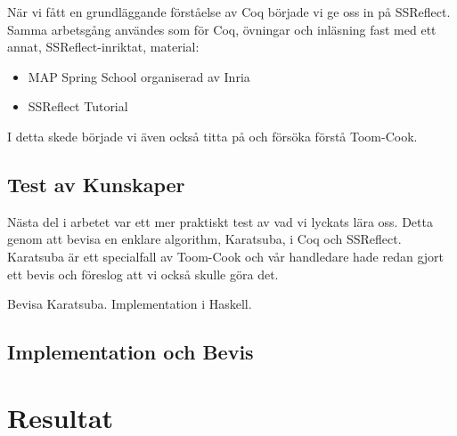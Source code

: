 \documentclass[a4paper]{article}
\begin{document}
När vi fått en grundläggande förståelse av Coq började vi ge oss in på
SSReflect. Samma arbetsgång användes som för Coq, övningar och inläsning fast
med ett annat, SSReflect-inriktat, material:
\begin{itemize}
  \item MAP Spring School organiserad av Inria
  \item SSReflect Tutorial
\end{itemize}
I detta skede började vi även också titta på och försöka förstå Toom-Cook.

\subsection{Test av Kunskaper}
Nästa del i arbetet var ett mer praktiskt test av vad vi lyckats lära oss.
Detta genom att bevisa en enklare algorithm, Karatsuba, i Coq och SSReflect.
Karatsuba är ett specialfall av Toom-Cook och vår handledare hade redan gjort
ett bevis och föreslog att vi också skulle göra det.

Bevisa Karatsuba. Implementation i Haskell.

\subsection{Implementation och Bevis}

\section{Resultat}



\nocite{*}
\end{document}
